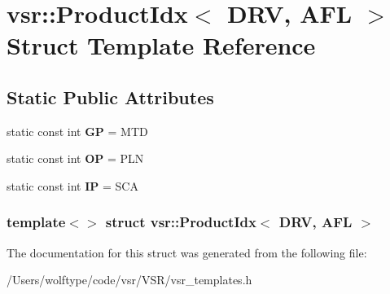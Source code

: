 \hypertarget{structvsr_1_1_product_idx_3_01_d_r_v_00_01_a_f_l_01_4}{\section{vsr\-:\-:Product\-Idx$<$ D\-R\-V, A\-F\-L $>$ Struct Template Reference}
\label{structvsr_1_1_product_idx_3_01_d_r_v_00_01_a_f_l_01_4}
}
\subsection*{Static Public Attributes}
\begin{DoxyCompactItemize}
\item 
\hypertarget{structvsr_1_1_product_idx_3_01_d_r_v_00_01_a_f_l_01_4_a5070d76f434f46583be8b11dbeb517bc}{static const int {\bfseries G\-P} = M\-T\-D}\label{structvsr_1_1_product_idx_3_01_d_r_v_00_01_a_f_l_01_4_a5070d76f434f46583be8b11dbeb517bc}

\item 
\hypertarget{structvsr_1_1_product_idx_3_01_d_r_v_00_01_a_f_l_01_4_a318bb786297ed407af766e131b31a787}{static const int {\bfseries O\-P} = P\-L\-N}\label{structvsr_1_1_product_idx_3_01_d_r_v_00_01_a_f_l_01_4_a318bb786297ed407af766e131b31a787}

\item 
\hypertarget{structvsr_1_1_product_idx_3_01_d_r_v_00_01_a_f_l_01_4_a1d3aec3b5e18a8a7d371f2e33b4cd755}{static const int {\bfseries I\-P} = S\-C\-A}\label{structvsr_1_1_product_idx_3_01_d_r_v_00_01_a_f_l_01_4_a1d3aec3b5e18a8a7d371f2e33b4cd755}

\end{DoxyCompactItemize}
\subsubsection*{template$<$$>$ struct vsr\-::\-Product\-Idx$<$ D\-R\-V, A\-F\-L $>$}



The documentation for this struct was generated from the following file\-:\begin{DoxyCompactItemize}
\item 
/\-Users/wolftype/code/vsr/\-V\-S\-R/vsr\-\_\-templates.\-h\end{DoxyCompactItemize}

